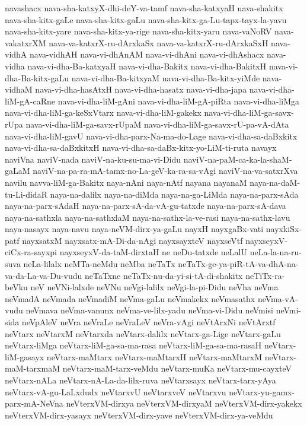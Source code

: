 {navashacx
nava-sha-katxyX-dhi-deY-va-tamf
nava-sha-katxyaH
nava-shakitx
nava-sha-kitx-gaLe
nava-sha-kitx-gaLu
nava-sha-kitx-ga-Lu-tapx-tayx-la-yavu
nava-sha-kitx-yare
nava-sha-kitx-ya-rige
nava-sha-kitx-yaru
nava-vaNoRV
nava-vakatxrXM
nava-va-katxrX-ru-dArxkaSx
nava-va-katxrX-ru-dArxkaSxH
nava-vidhA
nava-vidhAH
nava-vi-dhAnAM
nava-vi-dhAni
nava-vi-dhAshacx
nava-vidha
nava-vi-dha-Ba-katxyaH
nava-vi-dha-Bakitx
nava-vi-dha-BakitxH
nava-vi-dha-Ba-kitx-gaLu
nava-vi-dha-Ba-kitxyaM
nava-vi-dha-Ba-kitx-yiMde
nava-vidhaM
nava-vi-dha-hasAtxH
nava-vi-dha-hasatx
nava-vi-dha-japa
nava-vi-dha-liM-gA-caRne
nava-vi-dha-liM-gAni
nava-vi-dha-liM-gA-piRta
nava-vi-dha-liMga
nava-vi-dha-liM-ga-keSxVtarx
nava-vi-dha-liM-gakekx
nava-vi-dha-liM-ga-savx-rUpa
nava-vi-dha-liM-ga-savx-rUpaM
nava-vi-dha-liM-ga-savx-rU-pa-vA-dAta
nava-vi-dha-liM-gavU
nava-vi-dha-parx-Na-ma-do-Lage
nava-vi-dha-sa-daBxkitx
nava-vi-dha-sa-daBxkitxH
nava-vi-dha-sa-daBx-kitx-yo-LiM-ti-ruta
navayx
naviVna
naviV-nada
naviV-na-ku-su-ma-vi-Didu
naviV-na-paM-ca-ka-la-shaM-gaLaM
naviV-na-pa-ra-mA-tamx-no-La-geV-ka-ra-sa-vAgi
naviV-na-va-satxrXva
navilu
navva-liM-ga-Bakitx
naya-nAni
naya-nAtf
nayana
nayanaM
naya-na-daM-tu-Li-didaR
naya-na-dalilx
naya-na-diMda
naya-na-ga-LiMda
naya-na-parx-sAda
naya-na-parx-sAdaH
naya-na-parx-sA-da-vA-gu-tatxde
naya-na-parx-sA-dava
naya-na-sathxla
naya-na-sathxlaM
naya-na-sathx-la-ve-rasi
naya-na-sathx-lavu
naya-nasayx
naya-navu
naya-neVM-dirx-ya-gaLu
nayxH
nayxgaBx-vati
nayxkiSx-patf
nayxsatxM
nayxsatx-mA-Di-da-nAgi
nayxsayxteV
nayxseVtf
nayxseyxV-ciCx-ra-sayxpi
nayxseyxV-da-taM-dirxtaH
ne
neDu-tatxde
neLalU
neLa-la-na-ru-suva
neLa-lilalx
neMTa-neMdu
neMba
neTaTx
neTaTx-ge-ya-piR-tA-va-dhA-na-va-da-La-va-Du-vudu
neTaTxne
neTaTx-nu-da-yi-si-tA-di-shakitx
neTiTx-ra-beVku
neV
neVNi-lalxde
neVNu
neVgi-lalilx
neVgi-la-pi-Didu
neVha
neVma
neVmadA
neVmada
neVmadiM
neVma-gaLu
neVmakekx
neVmasathx
neVma-vA-vudu
neVmava
neVma-vanunx
neVma-ve-lilx-yadu
neVma-vi-Didu
neVmisi
neVmi-sida
neVpAleV
neVra
neVraLe
neVraLeV
neVra-vAgi
neVtArxNi
neVtArxtf
neVtarx
neVtarxM
neVtarxda
neVtarx-dalilx
neVtarx-ga-Lige
neVtarx-gaLu
neVtarx-liMga
neVtarx-liM-ga-sa-ma-rasa
neVtarx-liM-ga-sa-ma-rasaH
neVtarx-liM-gasayx
neVtarx-maMtarx
neVtarx-maMtarxH
neVtarx-maMtarxM
neVtarx-maM-tarxmaM
neVtarx-maM-tarx-veMdu
neVtarx-muKa
neVtarx-mu-cayxteV
neVtarx-nALa
neVtarx-nA-La-da-lilx-ruva
neVtarxsayx
neVtarx-tarx-yAya
neVtarx-vA-gu-LaLxdudx
neVtarxvU
neVtarxveV
neVtarxvu
neVtarx-yu-gamx-parx-mA-NeVna
neVterxVM-dirxya
neVterxVM-dirxyaM
neVterxVM-dirx-yakekx
neVterxVM-dirx-yasayx
neVterxVM-dirx-yave
neVterxVM-dirx-ya-veMdu
}
